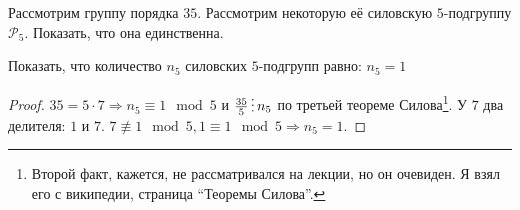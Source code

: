 \begin{exercise}
    Рассмотрим группу порядка \(35\). Рассмотрим некоторую её силовскую \(5\)-подгруппу \(\mathcal{P}_5\). Показать, что она единственна.

    \begin{remark}
        Показать, что количество \(n_5\) силовских \(5\)-подгрупп равно: \(n_5 = 1\)
    \end{remark}
\end{exercise}
\begin{proof}
    \(35 = 5 \cdot 7 \Rightarrow n_5 \equiv 1 \mod 5\) и \(\frac{35}{5} \divided n_5\) по третьей теореме Силова\footnote{Второй факт, кажется, не рассматривался на лекции, но он очевиден. Я взял его с википедии, страница ``Теоремы Силова''.}. У \(7\) два делителя: \(1\) и \(7\). \(7 \not\equiv 1 \mod 5, 1 \equiv 1 \mod 5 \Rightarrow n_5 = 1\).
\end{proof}

